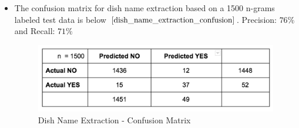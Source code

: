 \documentclass[twoside,12pt]{article}
\begin{document}
\begin{itemize}
\item
The confusion matrix for dish name extraction based on a 1500 n-grams labeled test data is below $\eqref{dish_name_extraction_confusion}$.  Precision: $76\%$ and Recall: $71\%$ 

\begin{figure}[hb]
  \centering
  \includegraphics[width=\textwidth]{confuse.png}	
  \caption{Dish Name Extraction - Confusion Matrix}
  \label{dish_name_extraction_confusion}
\end{figure}


\end{itemize}
\end{document}
